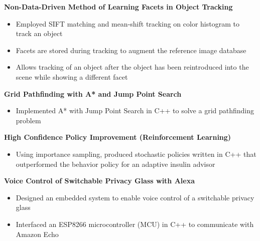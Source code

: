 \documentclass[letterpaper,11pt]{article}
\begin{document}
    \textbf{Non-Data-Driven Method of Learning Facets in Object Tracking} 
    \vspace{-4pt}
        \begin{itemize}
            \item Employed SIFT matching and mean-shift tracking on color histogram to track an object
            \vspace{-3pt}
            \item Facets are stored during tracking to augment the reference image database
            \vspace{-3pt}
            \item Allows tracking of an object after the object has been reintroduced into the scene while showing a different facet
        \end{itemize}
    \vspace{-2pt}
          
    \textbf{Grid Pathfinding with A* and Jump Point Search} 
    \vspace{-4pt}
        \begin{itemize}
            \item Implemented A* with Jump Point Search in C++ to solve a grid pathfinding problem
        \end{itemize}
    \vspace{-2pt}
    
    \textbf{High Confidence Policy Improvement (Reinforcement Learning)} 
    \vspace{-4pt}
        \begin{itemize}
            \item Using importance sampling, produced stochastic policies written in C++ that outperformed the behavior policy for an adaptive insulin advisor
        \end{itemize}
    \vspace{-2pt}
    
    \textbf{Voice Control of Switchable Privacy Glass with Alexa} 
    \vspace{-4pt}
        \begin{itemize}
  	 \item Designed an embedded system to enable voice control of a switchable privacy glass
            \vspace{-3pt}
            \item Interfaced an ESP8266 microcontroller (MCU) in C++ to communicate with Amazon Echo
        \end{itemize}
        
\end{document}
